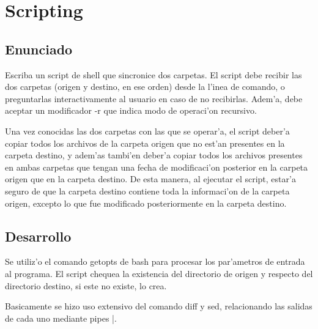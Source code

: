\section{Scripting}
\subsection{Enunciado}
    Escriba un script de shell que sincronice dos carpetas. El script debe recibir las dos carpetas (origen y destino, en ese orden) desde la l'inea de comando, o preguntarlas interactivamente al usuario en caso de no recibirlas. Adem'a, debe aceptar un modificador -r que indica modo de operaci'on recursivo.

    Una vez conocidas las dos carpetas con las que se operar'a, el script deber'a copiar todos los archivos de la carpeta origen que no est'an presentes en la carpeta destino, y adem'as tambi'en deber'a copiar todos los archivos presentes en ambas carpetas que tengan una fecha de modificaci'on posterior en la carpeta origen que en la carpeta destino. De esta manera, al ejecutar el script, estar'a seguro de que la carpeta destino contiene toda la informaci'on de la carpeta origen, excepto lo que fue modificado posteriormente en la carpeta destino.

\subsection{Desarrollo}
    Se utiliz'o el comando getopts de bash para procesar los par'ametros de entrada al programa. El script chequea la existencia del directorio de origen y respecto del directorio destino, si este no existe, lo crea. 
    
    Basicamente se hizo uso extensivo del comando diff y sed, relacionando las salidas de cada uno mediante pipes |.
    
